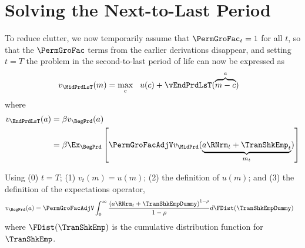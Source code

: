 
\hypertarget{solving-the-next-to-last-period}{}
\hypertarget{solving-the-next}{}
\section{Solving the Next-to-Last Period}\label{sec:solving-the-next}

To reduce clutter, we now temporarily assume that $\PermGroFac_{t}=1$ for all $t$, so that the $\PermGroFac$ terms from the earlier derivations disappear, and setting $t=T$ the problem in the second-to-last period of life can now be expressed as
\begin{equation}\begin{gathered}\begin{aligned}
  v_{\MidPrdLsT}(m)  & = \max_{c} ~~ u(c) +
                              \vEndPrdLsT(\overbrace{m-c}^{a})
                              \label{eq:vEndTm1}
\end{aligned}\end{gathered}\end{equation}
where 
\begin{equation*}\begin{gathered}\begin{aligned}
  v_{\EndPrdLsT}(a)  & = \beta v_{\BegPrd}(a) 
\\                          & = \beta \Ex_{\BegPrd} \left[\PermGroFacAdjV v_{\MidPrd}(\underbrace{a \RNrm_{t} + \TranShkEmp_{t}}_{{m}_{t}})\right]
    \end{aligned}\end{gathered}\end{equation*}



Using (0) $t=T$; (1) $v_{t}(m)=u(m)$; (2) the definition of $u(m)$; and (3) the definition of the expectations operator,  %
\begin{equation}\begin{gathered}\begin{aligned}
      v_{\BegPrd}(a)   & = \PermGroFacAdjV\int_{0}^{\infty} \frac{\left(a \RNrm_{t}+ \TranShkEmpDummy\right)^{1-\rho}}{1-\rho}  d\FDist(\TranShkEmpDummy) \label{eq:NumDefInt}
    \end{aligned}\end{gathered}\end{equation}
where $\FDist(\TranShkEmp)$ is the cumulative distribution function for ${\TranShkEmp}$.

